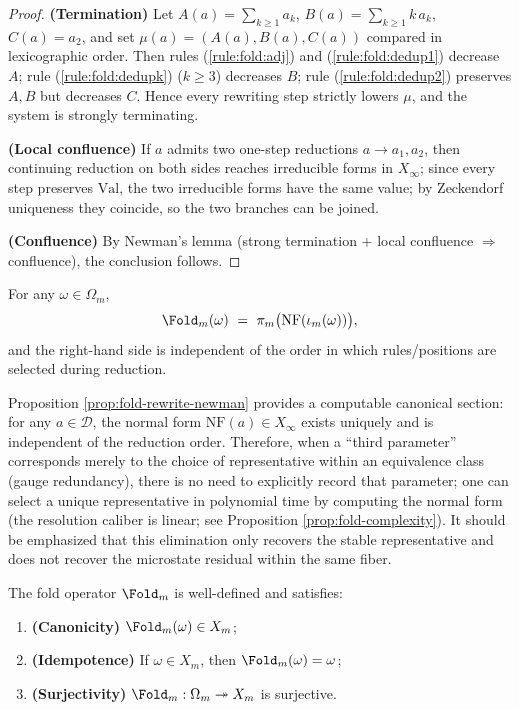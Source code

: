 \begin{proof}
\textbf{(Termination)} Let $A(a)=\sum_{k\ge 1} a_k$, $B(a)=\sum_{k\ge 1} k\,a_k$, $C(a)=a_2$, and set $\mu(a)=(A(a),B(a),C(a))$ compared in lexicographic order. Then rules (\ref{rule:fold:adj}) and (\ref{rule:fold:dedup1}) decrease $A$; rule (\ref{rule:fold:dedupk}) ($k\ge 3$) decreases $B$; rule (\ref{rule:fold:dedup2}) preserves $A,B$ but decreases $C$. Hence every rewriting step strictly lowers $\mu$, and the system is strongly terminating.

\textbf{(Local confluence)} If $a$ admits two one-step reductions $a\to a_1,a_2$, then continuing reduction on both sides reaches irreducible forms in $X_\infty$; since every step preserves $\mathrm{Val}$, the two irreducible forms have the same value; by Zeckendorf uniqueness they coincide, so the two branches can be joined.

\textbf{(Confluence)} By Newman's lemma (strong termination + local confluence $\Rightarrow$ confluence), the conclusion follows.
\end{proof}

\begin{corollary}\label{cor:foldm-order-indep}
For any $\omega\in\Omega_m$,
\[
\Fold_m(\omega)\ =\ \pi_m\bigl(\mathrm{NF}(\iota_m(\omega))\bigr),
\]
and the right-hand side is independent of the order in which rules/positions are selected during reduction.
\end{corollary}

\begin{remark}\label{rem:fold-normal-form-computable-section}
Proposition \ref{prop:fold-rewrite-newman} provides a computable canonical section: for any $a\in\mathcal{D}$, the normal form $\mathrm{NF}(a)\in X_\infty$ exists uniquely and is independent of the reduction order. Therefore, when a ``third parameter'' corresponds merely to the choice of representative within an equivalence class (gauge redundancy), there is no need to explicitly record that parameter; one can select a unique representative in polynomial time by computing the normal form (the resolution caliber is linear; see Proposition \ref{prop:fold-complexity}). It should be emphasized that this elimination only recovers the stable representative and does not recover the microstate residual within the same fiber.
\end{remark}

\begin{proposition}\label{prop:fold-basic}
The fold operator $\Fold_m$ is well-defined and satisfies:
\begin{enumerate}
\normalfont
  \item \textbf{(Canonicity)} $\Fold_m(\omega)\in X_m$;
  \item \textbf{(Idempotence)} If $\omega\in X_m$, then $\Fold_m(\omega)=\omega$;
  \item \textbf{(Surjectivity)} $\Fold_m:\Omega_m\twoheadrightarrow X_m$ is surjective.
\end{enumerate}
\end{proposition}

